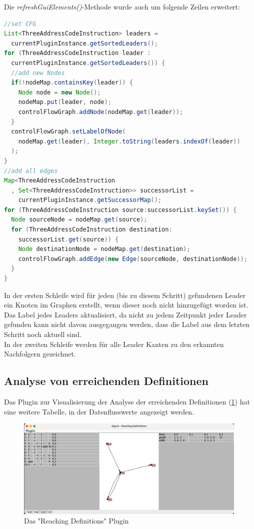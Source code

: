 \newpage
Die \textit{refreshGuiElements()}-Methode wurde auch um folgende Zeilen erweitert:
\begin{lstlisting}[language=Java, caption={Aktualisieren der Tabelle}, label={cde:refresh2}]
//set CFG
List<ThreeAddressCodeInstruction> leaders = 
  currentPluginInstance.getSortedLeaders();
for (ThreeAddressCodeInstruction leader : 
  currentPluginInstance.getSortedLeaders()) {
  //add new Nodes
  if(!nodeMap.containsKey(leader)) {
    Node node = new Node();
    nodeMap.put(leader, node);
    controlFlowGraph.addNode(nodeMap.get(leader));
  }
  controlFlowGraph.setLabelOfNode(
    nodeMap.get(leader), Integer.toString(leaders.indexOf(leader))
  );
}
//add all edges
Map<ThreeAddressCodeInstruction
  , Set<ThreeAddressCodeInstruction>> successorList = 
    currentPluginInstance.getSuccessorMap();
for (ThreeAddressCodeInstruction source:successorList.keySet()) {
  Node sourceNode = nodeMap.get(source);
  for (ThreeAddressCodeInstruction destination:
    successorList.get(source)) {
    Node destinationNode = nodeMap.get(destination);
    controlFlowGraph.addEdge(new Edge(sourceNode, destinationNode));
  }
}
\end{lstlisting}
In der ersten Schleife wird für jeden (bis zu diesem Schritt) 
gefundenen Leader ein Knoten im Graphen erstellt, wenn dieser 
noch nicht hinzugefügt worden ist. Das Label jedes Leaders aktualisiert,
da nicht zu jedem Zeitpunkt jeder Leader gefunden kann nicht davon ausgegangen werden,
dass die Label aus dem letzten Schritt noch aktuell sind.\\
In der zweiten Schleife werden für alle Leader Kanten zu den erkannten Nachfolgern gezeichnet.



\newpage
\subsection{Analyse von erreichenden Definitionen}
Das Plugin zur Visualisierung der Analyse der erreichenden Definitionen (\cref{fig:reachingDefinitions})
hat eine weitere Tabelle, in der Datenflusswerte angezeigt werden.
\begin{figure}[h]
  \centering
  \includegraphics[width=0.99\textwidth]{fig/Screenshot_ReachingDefinitions.png}
  \caption{Das "Reaching Definitions" Plugin}
  \label{fig:reachingDefinitions}
\end{figure}

